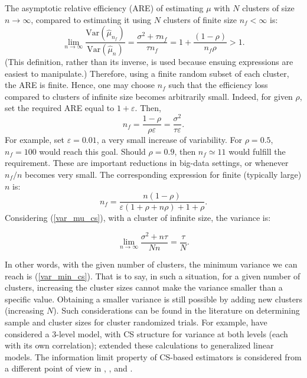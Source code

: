 \documentclass[11pt,a5paper,twoside]{book}
\begin{document}
The asymptotic relative efficiency (ARE) of estimating $\mu$ with $N$ clusters of size $n\rightarrow \infty$, compared to estimating it using $N$ clusters of finite size $n_f<\infty$ is:
\begin{equation}
\label{eff_cs}
\lim_{n\rightarrow\infty} \frac{\mathrm{Var}(\widehat{\mu}_{n_f})}{\mathrm{Var}(\widehat{\mu}_n)} = \frac{\sigma^2 + \tau n_f}{\tau n_f} = 1+\frac{(1-\rho) }{n_f \rho} >1.
\end{equation}
(This definition, rather than its inverse, is used because ensuing expressions are easiest to manipulate.) Therefore, using a finite random subset of each cluster, the ARE is finite. Hence, one may choose $n_f$ such that the efficiency loss compared to clusters of infinite size becomes arbitrarily small. Indeed, for given $\rho$, set the required ARE equal to $1+\varepsilon$. Then, 
\begin{equation}
\label{nf_var_min_cs}
n_f= \frac{1-\rho}{\rho\varepsilon} = \frac{\sigma^2}{\tau \varepsilon}.
\end{equation}
For example, set $\varepsilon=0.01$, a very small increase of variability. For $\rho=0.5$, $n_f=100$ would reach this goal. Should $\rho=0.9$, then $n_f\simeq 11$ would fulfill the requirement. These are important reductions in big-data settings, or whenever $n_f/n$ becomes very small. The corresponding expression for finite (typically large) $n$ is:
$$n_f=\frac{n(1-\rho)}{\varepsilon(1+\rho+n\rho)+1+\rho}.$$
Considering (\ref{var_mu_cs}), with a cluster of infinite size, the variance is:

\begin{equation}
\label{var_min_cs}
\lim_{n\rightarrow \infty} \frac{\sigma^2 + n \tau}{Nn} = \frac{\tau}{N}.
\end{equation}

In other words, with the given number of clusters, the minimum variance we can reach is (\ref{var_min_cs}). That is to say, in such a situation, for a given number of clusters, increasing the cluster sizes cannot make the variance smaller than a specific value. Obtaining a smaller variance is still possible by adding new clusters (increasing $N$). Such considerations can be found in the literature on determining sample and cluster sizes for cluster randomized trials. For example, \cite{teerenstra2008} have considered a 3-level model, with CS structure for variance at both levels (each with its own correlation); \cite{teerenstra2010} extended these calculations to generalized linear models. The information limit property of CS-based estimators is considered from a different point of view in \cite{feng2001}, \cite{guittet2005}, and \cite{hemming2011}.
\end{document}
